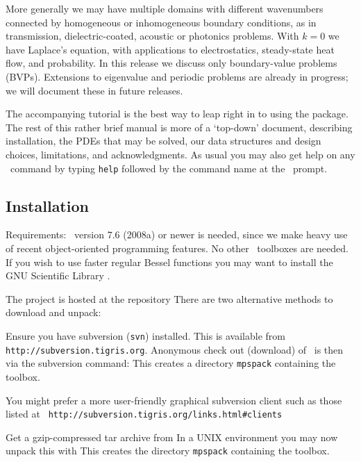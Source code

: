 \documentclass[12pt]{article}
\begin{document}
More generally we may have multiple domains with different
wavenumbers connected by homogeneous or inhomogeneous boundary conditions,
as in transmission, dielectric-coated, acoustic or photonics problems.
With $k=0$ we have Laplace's equation, with applications to
electrostatics, steady-state heat flow, and probability.
In this release we discuss only boundary-value problems (BVPs).
Extensions to eigenvalue and periodic problems are already in progress;
we will document these in future releases.

The accompanying tutorial is the best way to leap right in to using
the package.
The rest of this rather brief manual is more of a `top-down' document,
describing installation, the PDEs that may be solved,
our data structures and design choices, limitations, and acknowledgments.
As usual you
may also get help on any \mpspack\ command by typing {\tt help} followed
by the command name at the \matlab\ prompt.


\subsection{Installation}

Requirements: \matlab\ version 7.6 (2008a) or newer is needed,
since we make heavy use of recent object-oriented programming features.
No other \matlab\ toolboxes are needed.
If you wish to use faster regular Bessel functions you may want to
install the GNU Scientific Library \cite{GSL}.

The project is hosted at the repository
There are two alternative methods to download and unpack:
\ben
\item
Ensure you have subversion ({\tt svn}) installed.
This is available from {\tt http://subversion.tigris.org}.
Anonymous check out (download) of \mpspack\ is then via the subversion
command:
This creates a directory {\tt mpspack} containing the toolbox.

You might prefer a more user-friendly graphical
subversion client such as those listed at {\tt
http://subversion.tigris.org/links.html\#clients}

\item
Get a gzip-compressed tar archive from
In a UNIX environment you may now
unpack this with
This creates the directory {\tt mpspack} containing the toolbox.
\end{document}
